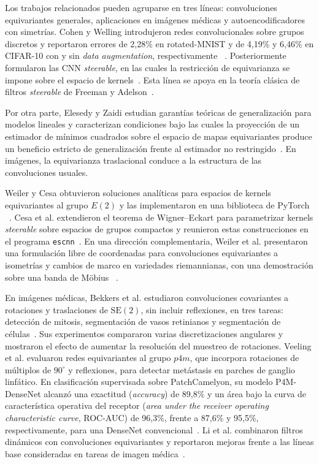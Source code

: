 Los trabajos relacionados pueden agruparse en tres líneas: convoluciones
equivariantes generales, aplicaciones en imágenes médicas y autoencodificadores
con simetrías. Cohen y Welling introdujeron redes convolucionales sobre
grupos discretos y reportaron errores de 2,28\% en rotated-MNIST y de 4,19\% y
6,46\% en CIFAR-10 con y sin \emph{data augmentation}, respectivamente
~\cite{cohen_group_2016}. Posteriormente formularon las CNN \emph{steerable},
en las cuales la restricción de equivarianza se impone sobre el espacio de
kernels~\cite{cohen_steerable_2016}. Esta línea se apoya en la teoría clásica
de filtros \emph{steerable} de Freeman y Adelson~\cite{freeman_design_1991}.

Por otra parte, Elesedy y Zaidi estudian garantías teóricas de generalización
para modelos lineales y caracterizan condiciones bajo las cuales la proyección
de un estimador de mínimos cuadrados sobre el espacio de mapas equivariantes
produce un beneficio estricto de generalización frente al estimador no
restringido~\cite{elesedy_provably_2021}. En imágenes, la
equivarianza traslacional conduce a la estructura de las convoluciones
usuales.

Weiler y Cesa obtuvieron soluciones analíticas para espacios de kernels
equivariantes al grupo \(E(2)\) y las implementaron en una biblioteca de PyTorch
~\cite{weiler_general_2019}. Cesa et al. extendieron el teorema de
Wigner--Eckart para parametrizar kernels \emph{steerable} sobre espacios de
grupos compactos y reunieron estas construcciones en el programa
\texttt{escnn}~\cite{cesa_program_2021}. En una dirección complementaria,
Weiler et al. presentaron una formulación libre de coordenadas para
convoluciones equivariantes a isometrías y cambios de marco en variedades
riemannianas, con una demostración sobre una banda de Möbius
~\cite{weiler_coordinate_2021}.

En imágenes médicas, Bekkers et al. estudiaron convoluciones covariantes a
rotaciones y traslaciones de \(\mathrm{SE}(2)\), sin incluir reflexiones, en
tres tareas: detección de mitosis, segmentación de vasos retinianos y
segmentación de células~\cite{bekkers_roto-translation_2018}. Sus experimentos
compararon varias discretizaciones angulares y mostraron el efecto de aumentar
la resolución del muestreo de rotaciones. Veeling et al. evaluaron redes
equivariantes al grupo \(p4m\), que incorpora rotaciones de múltiplos de
\(90^\circ\) y reflexiones, para detectar metástasis en parches de ganglio
linfático. En clasificación supervisada sobre PatchCamelyon, su modelo
P4M-DenseNet alcanzó una exactitud (\emph{accuracy}) de 89,8\% y un área bajo la
curva de característica operativa del receptor
(\emph{area under the receiver operating characteristic curve}, ROC-AUC) de
96,3\%, frente a 87,6\% y 95,5\%, respectivamente, para una DenseNet
convencional~\cite{veeling_rotation_2018}. Li et al. combinaron filtros dinámicos
con convoluciones equivariantes y reportaron mejoras frente a las líneas base
consideradas en tareas de imagen médica~\cite{li_dynamic_2020}.

